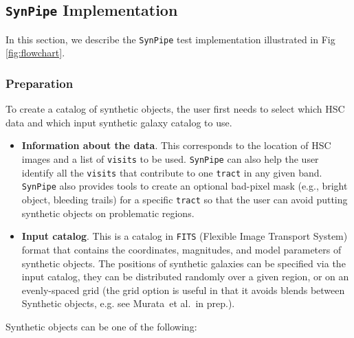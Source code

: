 \documentclass[useamsfonts]{pasj01}
\def\etal{{\ et al.~}}
\def\synpipe{\texttt{SynPipe}}
\def\tract{\texttt{tract}}
\def\visits{\texttt{visits}}
\begin{document}
\subsection{\synpipe{} Implementation }
    \label{ssec:flowchart}

    In this section, we describe the \synpipe{} test implementation illustrated in 
    Fig \ref{fig:flowchart}.

\subsubsection{Preparation}
    \label{sssec:prep}

    To create a catalog of synthetic objects, the user first needs to select which HSC 
    data and which input synthetic galaxy catalog to use. 

    \begin{itemize}

        \item \textbf{Information about the data}. 
            This  corresponds to the location of HSC images and a list of \visits{} to 
            be used. 
            \synpipe{} can also help the user identify all the \visits{} that contribute 
            to one \tract{} in any given band.
            \synpipe{} also provides tools to create an optional bad-pixel mask
            (e.g., bright object, bleeding trails) for a specific \tract{} so that
            the user can avoid putting synthetic objects on problematic regions.

        \item \textbf{Input catalog}. 
            This is a catalog in \texttt{FITS} (Flexible Image Transport System)
            format that contains the coordinates, magnitudes, and model parameters of 
            synthetic objects.  
            The positions of synthetic galaxies can be specified via the input catalog, 
            they can be distributed randomly over a given region, or on an 
            evenly-spaced grid (the grid option is useful in that it avoids blends 
            between Synthetic objects, e.g. see Murata\etal in prep.).  
            
    \end{itemize}

    \vspace{0.5cm}
    \noindent Synthetic objects can be one of the following:
\end{document}
